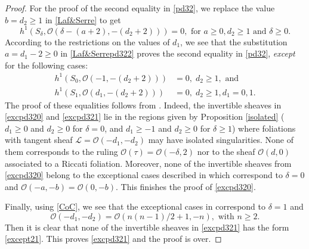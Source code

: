 \documentclass{amsart} %
\theoremstyle{definition}
\newcommand{\mcL}{\mathcal{L}}
\newcommand{\mcO}{\mathcal{O}}
\begin{document}
\begin{proof}
For the proof of the second equality in \eqref{pd32}, we replace the value $ b = d_2 \geq 1 $
in \eqref{Laf&Serre} to get
  \begin{equation}\label{Laf&Serrepd322}
   h^1(S_{\delta},\mcO(\delta-(a+2),-(d_2+2))) = 0, \text{ for }  a\geq 0, d_2\geq 1 \text{ and } \delta \geq 0.
  \end{equation}
According to the restrictions on the values of $ d_1 $, we see that the substitution $ a = d_1 - 2 \geq 0 $ in \eqref{Laf&Serrepd322} proves the second equality in \eqref{pd32}, \textit{except} for the following cases:
  \begin{align}\label{excpd320}
    h^1(S_{0},\mcO(-1,-(d_2+2))) & = 0, \; d_2 \geq 1, \text{ and } \\ \label{excpd321}
    h^1(S_{1},\mcO(d_1,-(d_2+2))) & = 0, \; d_2 \geq 1, d_1 = 0, 1.
  \end{align}
The proof of these equalities follows from \cite[Proposition 5.3]{Gomez-Mont}. Indeed, the invertible sheaves in
\eqref{excpd320} and \eqref{excpd321} lie in the regions given by Proposition \ref{isolated}
($ d_1\geq 0 $ and $ d_2 \geq 0 $ for $\delta = 0 $, and $ d_1 \geq -1 $ and $ d_2 \geq 0 $ for
$\delta \geq 1 $) where foliations with tangent sheaf $ \mcL = \mcO(-d_1, -d_2) $ may have isolated
singularities. None of them corresponds to the ruling $ \mcO(\tau) = \mcO(-\delta, 2 ) $ nor to
the sheaf $ \mcO( d, 0) $ associated to a Riccati foliation. Moreover, none of the invertible sheaves
from \eqref{excpd320} belong to the exceptional cases  described in \cite[Proposition 5.3, (1)]{Gomez-Mont}
which correspond to $ \delta = 0 $ and $ \mcO(-a, -b) = \mcO(0, -b) $. This finishes the proof of \eqref{excpd320}.

Finally, using \eqref{CoC}, we see that the exceptional cases in \cite[Proposition 5.3, (2)]{Gomez-Mont}
correspond to $ \delta = 1 $ and
  \begin{equation}\label{except21}
     \mcO( -d_1, -d_2 ) = \mcO( n(n-1)/2 + 1, -n ), \text{ with } n \geq 2.
  \end{equation}
Then it is clear that none of the invertible sheaves in \eqref{excpd321} has the form \eqref{except21}. This proves \eqref{excpd321} and the proof is over.
\end{proof}
\end{document}
